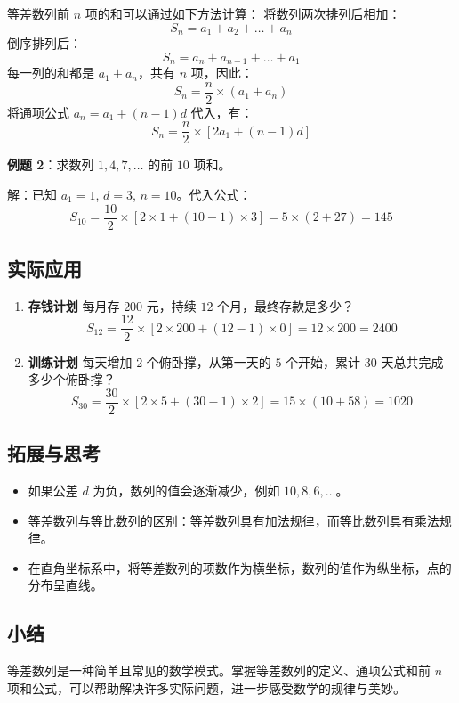 等差数列前 $n$ 项的和可以通过如下方法计算：  
将数列两次排列后相加：
\[
S_n = a_1 + a_2 + \dots + a_n
\]
倒序排列后：
\[
S_n = a_n + a_{n-1} + \dots + a_1
\]
每一列的和都是 $a_1 + a_n$，共有 $n$ 项，因此：
\[
S_n = \frac{n}{2} \times (a_1 + a_n)
\]
将通项公式 $a_n = a_1 + (n-1)d$ 代入，有：
\[
S_n = \frac{n}{2} \times [2a_1 + (n-1)d]
\]

\textbf{例题 2}：求数列 $1, 4, 7, \dots$ 的前 $10$ 项和。

解：已知 $a_1 = 1$, $d = 3$, $n = 10$。代入公式：
\[
S_{10} = \frac{10}{2} \times [2 \times 1 + (10-1) \times 3] = 5 \times (2 + 27) = 145
\]

\subsection*{实际应用}

\begin{enumerate}
    \item \textbf{存钱计划}  
    每月存 $200$ 元，持续 $12$ 个月，最终存款是多少？
    \[
    S_{12} = \frac{12}{2} \times [2 \times 200 + (12-1) \times 0] = 12 \times 200 = 2400
    \]

    \item \textbf{训练计划}  
    每天增加 $2$ 个俯卧撑，从第一天的 $5$ 个开始，累计 $30$ 天总共完成多少个俯卧撑？
    \[
    S_{30} = \frac{30}{2} \times [2 \times 5 + (30-1) \times 2] = 15 \times (10 + 58) = 1020
    \]
\end{enumerate}

\subsection*{拓展与思考}

\begin{itemize}
    \item 如果公差 $d$ 为负，数列的值会逐渐减少，例如 $10, 8, 6, \dots$。
    \item 等差数列与等比数列的区别：等差数列具有加法规律，而等比数列具有乘法规律。
    \item 在直角坐标系中，将等差数列的项数作为横坐标，数列的值作为纵坐标，点的分布呈直线。
\end{itemize}

\subsection*{小结}

等差数列是一种简单且常见的数学模式。掌握等差数列的定义、通项公式和前 $n$ 项和公式，可以帮助解决许多实际问题，进一步感受数学的规律与美妙。

